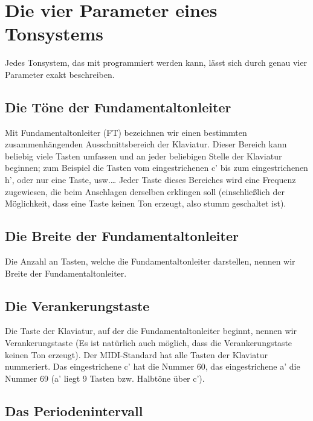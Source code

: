 \section{Die vier Parameter eines Tonsystems}\label{sec:die-vier-parameter}

Jedes Tonsystem, das mit \mutabor{} programmiert
werden kann, lässt sich durch genau vier Parameter exakt
beschreiben.
\subsection{Die Töne der Fundamentaltonleiter}\label{sec:die-tone-der}

Mit Fundamentaltonleiter (FT) bezeichnen wir einen bestimmten
zusammenhängenden Ausschnittsbereich der Klaviatur. Dieser Bereich
kann beliebig viele Tasten umfassen und an jeder beliebigen Stelle
der Klaviatur beginnen; zum Beispiel die Tasten vom
eingestrichenen c' bis zum eingestrichenen h', oder nur eine
Taste, usw.\dots{} Jeder Taste dieses Bereiches wird eine Frequenz
zugewiesen, die beim Anschlagen derselben erklingen soll
(einschließlich der Möglichkeit, dass eine Taste keinen Ton
erzeugt, also stumm geschaltet ist).

\subsection{Die Breite der Fundamentaltonleiter}\label{sec:die-breite-der}

Die Anzahl an Tasten, welche die Fundamentaltonleiter  darstellen,
nennen wir Breite der Fundamentaltonleiter.

\subsection{Die Verankerungstaste}\label{sec:die-verank}
Die Taste der Klaviatur, auf der die Fundamentaltonleiter beginnt, nennen wir
Verankerungstaste (Es ist natürlich auch möglich, dass die
Verankerungstaste keinen Ton erzeugt). Der MIDI-Standard hat alle
Tasten der Klaviatur nummeriert. Das eingestrichene c' hat die
Nummer 60, das eingestrichene a' die Nummer 69 (a' liegt 9
Tasten bzw. Halbtöne über c').

\subsection{Das Periodenintervall}\label{sec:das-peri}

